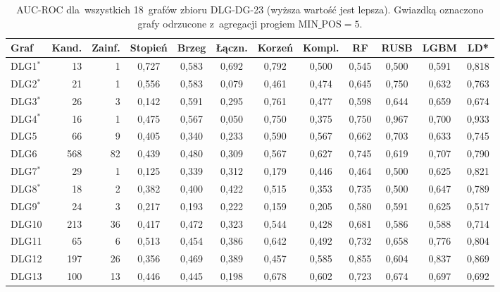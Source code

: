\begin{table}[ht]
\centering
\caption{AUC-ROC dla~wszystkich 18~grafów zbioru DLG-DG-23 (wyższa wartość jest lepsza). Gwiazdką oznaczono grafy odrzucone z~agregacji progiem $\mathrm{MIN\_POS} = 5$.}
\label{tab:dodb-auc-roc}
\footnotesize
\setlength{\tabcolsep}{3.5pt}
\begin{tabular}{lrrccccccccc}
\toprule
\textbf{Graf} & \textbf{Kand.} & \textbf{Zainf.} & \textbf{Stopień} & \textbf{Brzeg} & \textbf{Łączn.} & \textbf{Korzeń} & \textbf{Kompl.} & \textbf{RF} & \textbf{RUSB} & \textbf{LGBM} & \textbf{LD*} \\
\midrule
DLG1$^{*}$ & 13 & 1 & 0{,}727 & 0{,}583 & 0{,}692 & 0{,}792 & 0{,}500 & 0{,}545 & 0{,}500 & 0{,}591 & 0{,}818 \\
DLG2$^{*}$ & 21 & 1 & 0{,}556 & 0{,}583 & 0{,}079 & 0{,}461 & 0{,}474 & 0{,}645 & 0{,}750 & 0{,}632 & 0{,}763 \\
DLG3$^{*}$ & 26 & 3 & 0{,}142 & 0{,}591 & 0{,}295 & 0{,}761 & 0{,}477 & 0{,}598 & 0{,}644 & 0{,}659 & 0{,}674 \\
DLG4$^{*}$ & 16 & 1 & 0{,}475 & 0{,}567 & 0{,}050 & 0{,}750 & 0{,}375 & 0{,}750 & 0{,}967 & 0{,}700 & 0{,}933 \\
DLG5 & 66 & 9 & 0{,}405 & 0{,}340 & 0{,}233 & 0{,}590 & 0{,}567 & 0{,}662 & 0{,}703 & 0{,}633 & 0{,}745 \\
DLG6 & 568 & 82 & 0{,}439 & 0{,}480 & 0{,}309 & 0{,}567 & 0{,}627 & 0{,}745 & 0{,}619 & 0{,}707 & 0{,}790 \\
DLG7$^{*}$ & 29 & 1 & 0{,}125 & 0{,}339 & 0{,}312 & 0{,}179 & 0{,}446 & 0{,}464 & 0{,}500 & 0{,}625 & 0{,}821 \\
DLG8$^{*}$ & 18 & 2 & 0{,}382 & 0{,}400 & 0{,}422 & 0{,}515 & 0{,}353 & 0{,}735 & 0{,}500 & 0{,}647 & 0{,}789 \\
DLG9$^{*}$ & 24 & 3 & 0{,}217 & 0{,}193 & 0{,}222 & 0{,}159 & 0{,}205 & 0{,}580 & 0{,}591 & 0{,}625 & 0{,}517 \\
DLG10 & 213 & 36 & 0{,}417 & 0{,}472 & 0{,}323 & 0{,}544 & 0{,}428 & 0{,}681 & 0{,}586 & 0{,}588 & 0{,}714 \\
DLG11 & 65 & 6 & 0{,}513 & 0{,}454 & 0{,}386 & 0{,}642 & 0{,}492 & 0{,}732 & 0{,}658 & 0{,}776 & 0{,}804 \\
DLG12 & 197 & 26 & 0{,}356 & 0{,}469 & 0{,}389 & 0{,}457 & 0{,}585 & 0{,}855 & 0{,}604 & 0{,}837 & 0{,}869 \\
DLG13 & 100 & 13 & 0{,}446 & 0{,}445 & 0{,}198 & 0{,}678 & 0{,}602 & 0{,}723 & 0{,}674 & 0{,}697 & 0{,}692 \\

\end{tabular}
\end{table}
